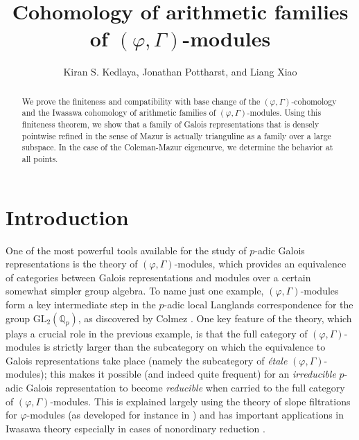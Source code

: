 \documentclass[12pt]{article}
\theoremstyle{definition}
\numberwithin{equation}{theorem}
\newcommand{\QQ}{\mathbb{Q}}
\begin{document}
\title{Cohomology of arithmetic families of $(\varphi, \Gamma)$-modules}
\author{Kiran S. Kedlaya, Jonathan Pottharst, and Liang Xiao}


\maketitle
\begin{abstract}
We prove the finiteness and compatibility with base change of the
$(\varphi, \Gamma)$-cohomology and the Iwasawa cohomology of
arithmetic families of $(\varphi, \Gamma)$-modules.  Using this
finiteness theorem, we show that a family of Galois representations
that is densely pointwise refined in the sense of Mazur is actually
trianguline as a family over a large subspace.  In the case of the
Coleman-Mazur eigencurve, we determine the behavior at all points.
\end{abstract}

\tableofcontents

\section{Introduction}

One of the most powerful tools available for the study of $p$-adic
Galois representations is the theory of
$(\varphi, \Gamma)$-modules, which provides an equivalence of
categories between Galois representations and
modules over a certain somewhat simpler group algebra.
To name just one example, $(\varphi, \Gamma)$-modules
form a key intermediate step in the $p$-adic local Langlands correspondence for
the group
$\mathrm{GL}_2(\QQ_p)$, as discovered by Colmez \cite{colmez-kirillov}.
One key feature of the theory, which plays a crucial role in the
previous example, is that
the full category of $(\varphi, \Gamma)$-modules is strictly larger
than the subcategory
on which the equivalence to Galois representations take place (namely
the subcategory of \emph{\'etale}
$(\varphi, \Gamma)$-modules); this makes it possible (and indeed quite
frequent) for an \emph{irreducible}
$p$-adic Galois representation to become \emph{reducible} when carried
to the full category of
$(\varphi, \Gamma)$-modules. This is explained largely using the
theory of slope filtrations for $\varphi$-modules
(as developed for instance in \cite{kedlaya-relative}) and has
important applications in Iwasawa theory
especially in cases of nonordinary reduction \cite{pottharst1, pottharst2}.
\end{document}
